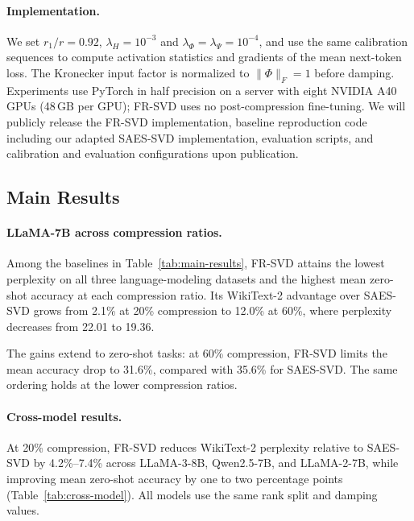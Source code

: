 \documentclass[11pt]{article}
\begin{document}
\paragraph{Implementation.}
We set $r_1/r=0.92$, $\lambda_H=10^{-3}$ and $\lambda_\Phi=\lambda_\Psi=10^{-4}$, and use the same calibration sequences to compute activation statistics and gradients of the mean next-token loss. The Kronecker input factor is normalized to $\|\Phi\|_F=1$ before damping. Experiments use PyTorch in half precision on a server with eight NVIDIA A40 GPUs (48\,GB per GPU); FR-SVD uses no post-compression fine-tuning. We will publicly release the FR-SVD implementation, baseline reproduction code including our adapted SAES-SVD implementation, evaluation scripts, and calibration and evaluation configurations upon publication.


\subsection{Main Results}\label{sec:main-results-llama7b}



\paragraph{LLaMA-7B across compression ratios.}

Among the baselines in Table~\ref{tab:main-results}, FR-SVD attains the lowest perplexity on all three language-modeling datasets and the highest mean zero-shot accuracy at each compression ratio. Its WikiText-2 advantage over SAES-SVD grows from 2.1\% at 20\% compression to 12.0\% at 60\%, where perplexity decreases from 22.01 to 19.36.

The gains extend to zero-shot tasks: at 60\% compression, FR-SVD limits the mean accuracy drop to 31.6\%, compared with 35.6\% for SAES-SVD. The same ordering holds at the lower compression ratios.

\paragraph{Cross-model results.}

At 20\% compression, FR-SVD reduces WikiText-2 perplexity relative to SAES-SVD by 4.2\%--7.4\% across LLaMA-3-8B, Qwen2.5-7B, and LLaMA-2-7B, while improving mean zero-shot accuracy by one to two percentage points (Table~\ref{tab:cross-model}). All models use the same rank split and damping values.
\end{document}
